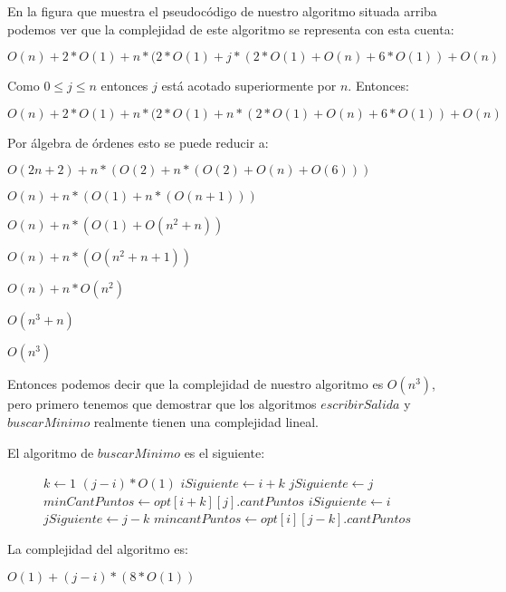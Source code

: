 En la figura que muestra el pseudocódigo de nuestro algoritmo situada arriba podemos ver que la complejidad de este algoritmo se representa con esta cuenta:

$O(n) + 2*O(1) + n*(2*O(1) + j*(2*O(1) +O(n) + 6*O(1)) + O(n)$

Como $0 \leq j \leq n$ entonces $j$ está acotado superiormente por $n$. Entonces:

$O(n) + 2*O(1) + n*(2*O(1) + n*(2*O(1) +O(n) + 6*O(1)) + O(n)$

Por álgebra de órdenes esto se puede reducir a:

$O(2n+2) + n*(O(2) + n*(O(2) + O(n) + O (6)))$

$O(n) + n*(O(1) + n*(O(n+1)))$

$O(n) + n*(O(1) + O(n^2+n))$

$O(n) + n*(O(n^2 +n +1))$

$O(n) + n*O(n^2)$

$O(n^3+n)$

$O(n^3)$

Entonces podemos decir que la complejidad de nuestro algoritmo es $O(n^3)$, pero primero tenemos que demostrar que los algoritmos $escribirSalida$ y $buscarMinimo$ realmente tienen una complejidad lineal.

El algoritmo de $buscarMinimo$ es el siguiente:

\begin{center}
 \begin{figure}[H]
  \begin{pseudo}
    \State $k \leftarrow 1$
     \hfill $(j-i)*O(1)$
	\State $iSiguiente \leftarrow i+k$
	\State $jSiguiente \leftarrow j$
	\State $minCantPuntos \leftarrow opt[i+k][j].cantPuntos$
      \EndIf
	\State $iSiguiente \leftarrow i$
	\State $jSiguiente \leftarrow j-k$
	\State $mincantPuntos \leftarrow opt[i][j-k].cantPuntos$
      \EndIf
    \EndWhile
   \EndProcedure
  \end{pseudo}

 \end{figure}

\end{center}

La complejidad del algoritmo es:

$O(1) + (j-i)*(8*O(1))$

